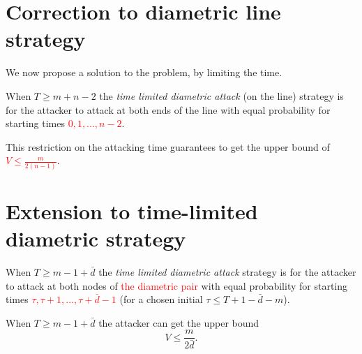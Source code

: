 \documentclass[11pt]{beamer}
\begin{document}
\section[]{Correction to diametric line strategy}
\hypertarget{Correction to line graph strategy}{}
\begin{frame}{\insertsection}
We now propose a solution to the problem, by limiting the time.

\begin{definition}
When $T \geq m+n-2$ the \textit{time limited diametric attack} (on the line) strategy is for the attacker to attack at both ends of the line with equal probability for starting times \textcolor{red}{$0,1,...,n-2$}.
\end{definition}

This restriction on the attacking time guarantees to get the upper bound of \textcolor{red}{$V \leq \frac{m}{2(n-1)}$}.
\end{frame}

\section[]{Extension to time-limited diametric strategy}
\hypertarget{Extension of correction strategy}{}
\begin{frame}{\insertsection}

\begin{definition}
When $T \geq m-1+\bar{d}$ the \textit{time limited diametric attack} strategy is for the attacker to attack at both nodes of \textcolor{red}{the diametric pair} with equal probability for starting times \textcolor{red}{$\tau,\tau +1,...,\tau + \bar{d}-1$} (for a chosen initial $\tau \leq T+1-\bar{d}-m$).
\end{definition}

\begin{lemma}
When $T \geq m-1 +\bar{d}$ the attacker can get the upper bound
$$V \leq \dfrac{m}{2\bar{d}}.$$
\end{lemma}

\end{frame}
\end{document}
